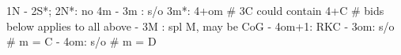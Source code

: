 1N - 2S*;
2N*: no 4m
   - 3m : s/o
3m*: 4+om  # 3C could contain 4+C
# bids below applies to all above
   - 3M : spl M, may be CoG
   - 4om+1: RKC
   - 3om: s/o  # m = C
   - 4om: s/o  # m = D